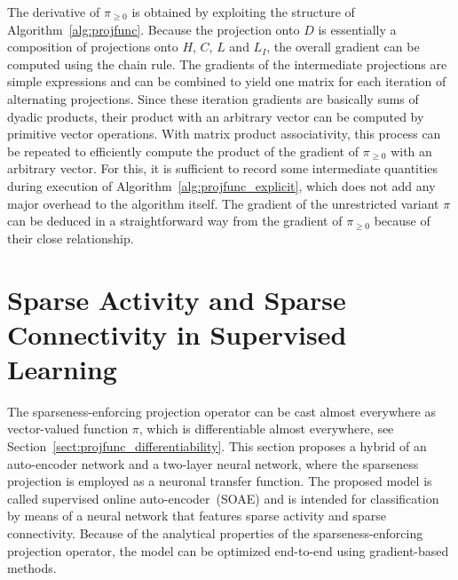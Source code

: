 \documentclass[twoside,11pt]{article}
\newcommand{\0}{\mathcal{O}}
\begin{document}
The derivative of $\pi_{\geq 0}$ is obtained by exploiting the structure of Algorithm~\ref{alg:projfunc}.
Because the projection onto $D$ is essentially a composition of projections onto $H$, $C$, $L$ and $L_I$, the overall gradient can be computed using the chain rule.
The gradients of the intermediate projections are simple expressions and can be combined to yield one matrix for each iteration of alternating projections.
Since these iteration gradients are basically sums of dyadic products, their product with an arbitrary vector can be computed by primitive vector operations.
With matrix product associativity, this process can be repeated to efficiently compute the product of the gradient of $\pi_{\geq 0}$ with an arbitrary vector.
For this, it is sufficient to record some intermediate quantities during execution of Algorithm~\ref{alg:projfunc_explicit}, which does not add any major overhead to the algorithm itself.
The gradient of the unrestricted variant $\pi$ can be deduced in a straightforward way from the gradient of $\pi_{\geq 0}$ because of their close relationship.

\section{Sparse Activity and Sparse Connectivity in Supervised Learning}
\label{sect:soae}
The sparseness-enforcing projection operator can be cast almost everywhere as vector-valued function $\pi$, which is differentiable almost everywhere, see Section~\ref{sect:projfunc_differentiability}.
This section proposes a hybrid of an auto-encoder network and a two-layer neural network, where the sparseness projection is employed as a neuronal transfer function.
The proposed model is called supervised online auto-encoder~(SOAE) and is intended for classification by means of a neural network that features sparse activity and sparse connectivity.
Because of the analytical properties of the sparseness-enforcing projection operator, the model can be optimized end-to-end using gradient-based methods.
\end{document}
